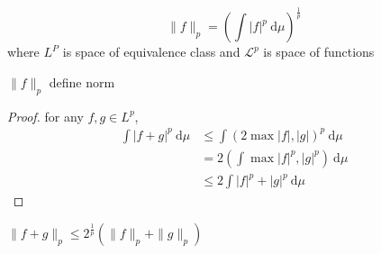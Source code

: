 
  

\begin{definition}
  \[\|f\|_p = \left(\int |f|^p \ \mathrm{d}\mu\right)^{\frac1p}\]
  where $L^P$ is space of equivalence class and $\mathcal{L}^p$ is space of functions
\end{definition}

\begin{claim}
  $\|f\|_p$ define norm
\end{claim}
\begin{proof}
  for any $f, g \in L^p$, 
  \begin{align*}
    \int |f+g|^p \ \mathrm{d}\mu &\le \int (2 \max{|f|,|g|})^p \ \mathrm{d}\mu \\
    &= 2\left(\int \max |f|^p, |g|^p\right) \ \mathrm{d}\mu \\
    &\le 2\int |f|^p + |g|^p\ \mathrm{d}\mu 
  \end{align*}
\end{proof}

\begin{remark}
  $\|f+g\|_p \le 2^{\frac1p}(\|f\|_p + \|g\|_p)$
\end{remark}
